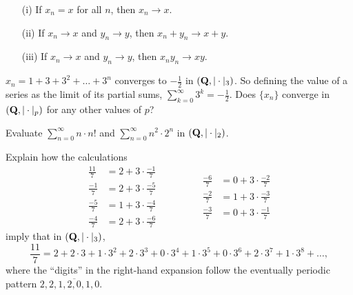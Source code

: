\begin{prob}\label{prob:28andahalf}\label{prob:calclimits}
\begin{enumerate}
    \item[(i)] If $x_n=x$ for all $n$, then $x_n\to x$.
    \item[(ii)] If $x_n\to x$ and $y_n\to y$, then $x_n+y_n\to x+y$.
    \item[(iii)] If $x_n\to x$ and $y_n\to y$, then $x_n y_n\to xy$.
\end{enumerate}
\end{prob}

\begin{prob}\label{prob:29} $x_n = 1+3+3^2+\dots+3^n$ converges to $-\frac12$ in $(\mathbf{Q},|\cdot|_3)$. So defining the value of a series as the limit of its partial sums, $\sum_{k=0}^{\infty} 3^k = -\frac12$. Does $\{x_n\}$ converge in $(\mathbf{Q},|\cdot|_p)$ for any other values of $p$? 
\end{prob}

\begin{prob}\label{prob:30} Evaluate $\sum_{n=0}^{\infty} n\cdot n!$ and $\sum_{n=0}^{\infty} n^2 \cdot 2^n$  in $(\mathbf{Q},|\cdot|_{2})$. \end{prob}

\begin{prob}\label{ex:rationalpadic0}\label{prob:31} Explain how the calculations 
{\scriptsize\begin{equation*}
\begin{split}
\frac{11}{7} &= 2 + 3\cdot \frac{-1}{7} \\
\frac{-1}{7} &= 2 + 3\cdot \frac{-5}{7} \\
\frac{-5}{7} &= 1 + 3 \cdot \frac{-4}{7} \\
\frac{-4}{7} &= 2 + 3 \cdot \frac{-6}{7}
  \end{split}\quad\quad\quad\quad
  \begin{split}
\frac{-6}{7} &= 0 + 3 \cdot \frac{-2}{7} \\
\frac{-2}{7} &= 1 + 3 \cdot \frac{-3}{7} \\
\frac{-3}{7} &= 0 + 3 \cdot \frac{-1}{7}
\end{split}
\end{equation*}}imply that in $(\mathbf{Q}, |\cdot|_3)$,
\[ \frac{11}{7} = 2 + 2\cdot 3 + 1 \cdot 3^2 + 2 \cdot 3^3 + 0 \cdot 3^4 + 1 \cdot 3^5 + 0 \cdot 3^6 + 2 \cdot 3^7 + 1 \cdot 3^8 + \dots,\]
where the ``digits'' in the right-hand expansion follow the eventually periodic pattern $2, \overline{2, 1, 2, 0, 1, 0}$.
\end{prob}    

